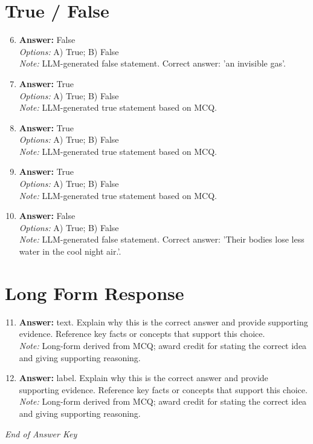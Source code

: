 \documentclass[12pt]{article}
\begin{document}
\section*{True / False}
\begin{enumerate}[label=\arabic*.]
\setcounter{enumi}{5}
\item \textbf{Answer:} False
\\ \textit{Options:} A) True; B) False
\\ \textit{Note:} LLM-generated false statement. Correct answer: 'an invisible gas'.
\item \textbf{Answer:} True
\\ \textit{Options:} A) True; B) False
\\ \textit{Note:} LLM-generated true statement based on MCQ.
\item \textbf{Answer:} True
\\ \textit{Options:} A) True; B) False
\\ \textit{Note:} LLM-generated true statement based on MCQ.
\item \textbf{Answer:} True
\\ \textit{Options:} A) True; B) False
\\ \textit{Note:} LLM-generated true statement based on MCQ.
\item \textbf{Answer:} False
\\ \textit{Options:} A) True; B) False
\\ \textit{Note:} LLM-generated false statement. Correct answer: 'Their bodies lose less water in the cool night air.'.
\end{enumerate}

\section*{Long Form Response}
\begin{enumerate}[label=\arabic*.]
\setcounter{enumi}{10}
\item \textbf{Answer:} text. Explain why this is the correct answer and provide supporting evidence. Reference key facts or concepts that support this choice.
\\ \textit{Note:} Long-form derived from MCQ; award credit for stating the correct idea and giving supporting reasoning.
\item \textbf{Answer:} label. Explain why this is the correct answer and provide supporting evidence. Reference key facts or concepts that support this choice.
\\ \textit{Note:} Long-form derived from MCQ; award credit for stating the correct idea and giving supporting reasoning.
\end{enumerate}

\vfill
\noindent\textit{End of Answer Key}
\end{document}
